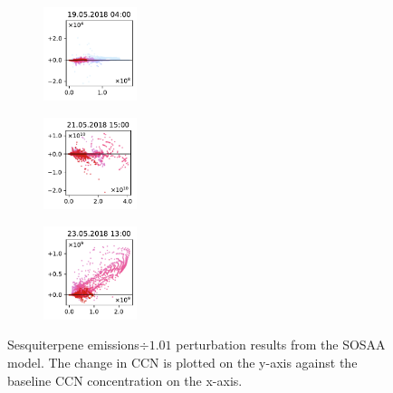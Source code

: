 \begin{figure}[H]
    \begin{subfigure}
        \centering
        \includegraphics[width=0.30\textwidth,valign=t]{evaluation/figures/perturbations/perturbation-19.05.2018:04.00-sesquiterpenes-div-1.01.pdf}
    \end{subfigure}
    \begin{subfigure}
        \centering
        \includegraphics[width=0.30\textwidth,valign=t]{evaluation/figures/perturbations/perturbation-21.05.2018:15.00-sesquiterpenes-div-1.01.pdf}
    \end{subfigure}
    \begin{subfigure}
        \centering
        \includegraphics[width=0.30\textwidth,valign=t]{evaluation/figures/perturbations/perturbation-23.05.2018:13.00-sesquiterpenes-div-1.01.pdf}
    \end{subfigure}
    
    \caption[Sesquiterpene emissions$\div 1.01$ perturbation SOSAA results]{Sesquiterpene emissions$\div 1.01$ perturbation results from the SOSAA model. The change in CCN is plotted on the y-axis against the baseline CCN concentration on the x-axis.}
    \label{fig:sosaa-perturbation-sesquiterpenes-div-1.01}
\end{figure}


